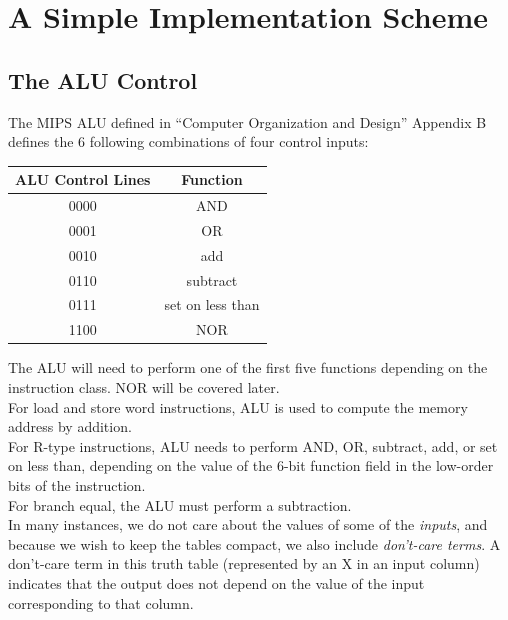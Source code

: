\documentclass[12pt]{article}
\theoremstyle{definition}
\begin{document}
  \section{A Simple Implementation Scheme}
  \subsection{The ALU Control}
  The MIPS ALU defined in ``Computer Organization and Design'' Appendix B defines the 6 following combinations of four control inputs:
  \begin{center}
  \begin{tabular} {c | c}
    ALU Control Lines & Function          \\ \hline
    0000              & AND               \\ \hline
    0001              & OR                \\ \hline
    0010              & add               \\ \hline
    0110              & subtract          \\ \hline
    0111              & set on less than  \\ \hline
    1100              & NOR               \\ \hline
  \end{tabular}
  \end{center}
  The ALU will need to perform one of the first five functions depending on the instruction class.
  NOR will be covered later. \\
  For load and store word instructions, ALU is used to compute the memory address by addition. \\
  For R-type instructions, ALU needs to perform AND, OR, subtract, add, or set on less than, depending on the value of the 6-bit function field in the low-order bits of the instruction. \\
  For branch equal, the ALU must perform a subtraction. \\

  In many instances, we do not care about the values of some of the \emph{inputs}, and because we wish to keep the tables compact, we also include \emph{don't-care terms}.
  A don't-care term in this truth table (represented by an X in an input column) indicates that the output does not depend on the value of the input corresponding to that column.
\end{document}

